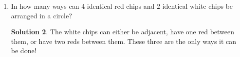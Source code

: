 \documentclass[twocolumn]{article}
\theoremstyle{definition}
\newtheorem*{solution}{Solution}
\begin{document}
\begin{enumerate}
        \begin{solution}
            MINIMIZATION has $12$ letters, with $4$ I's, $2$ M's, and $2$ N's, so it can be 
            rearranged in $\frac{12!}{4!2!2!}$ ways. Simplifying the factorials yields 
            $4989600$.
        \end{solution}
        \item In how many ways can $4$ identical red chips and $2$ identical white chips be 
        arranged in a circle?
        \begin{solution}
            The white chips can either be adjacent, have one red between them, or have two 
            reds between them. These three are the only ways it can be done!
        \end{solution}
    \end{enumerate}
\end{document}
